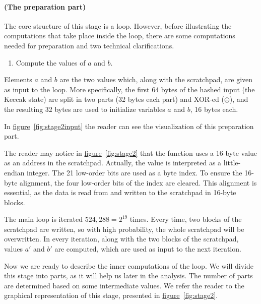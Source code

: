\paragraph{(The preparation part)} The core structure of this stage is a loop. However, before illustrating the computations that take place inside the loop, there are some computations needed for preparation and two technical clarifications.

\begin{enumerate}
  \item \label{memh: step 1} Compute the values of $a$ and $b$.
\end{enumerate}
Elements $a$ and $b$ are the two values which, along with the scratchpad, are given as input to the loop. More specifically, the first 64 bytes of the hashed input (the Keccak state) are split in two parts (32 bytes each part) and XOR-ed ($\oplus$), and the resulting 32 bytes are used to initialize variables $a$ and $b$, 16 bytes each.

In \hyperref[fig:stage2input]{figure}~\ref{fig:stage2input} the reader can see the visualization of this preparation part.
\clearpage

\begin{tcolorbox}[colback=yellow!5!white,colframe=yellow!65!black,title=\emph{Clarification 1:}]
  The reader may notice in \hyperref[fig:stage2]{figure}~\ref{fig:stage2} that the function uses a 16-byte value as an address in the scratchpad. Actually, the value is interpreted as a little-endian integer. The 21 low-order bits are used as a byte index. To ensure the 16-byte alignment, the four low-order bits of the index are cleared. This alignment is essential, as the data is read from and written to the scratchpad in 16-byte blocks.
\end{tcolorbox}
\vspace{0.2cm}

\begin{tcolorbox}[colback=yellow!5!white,colframe=yellow!65!black,title=\emph{Clarification 2:}]
  The main loop is iterated $524,288 = 2^{19}$ times. Every time, two blocks of the scratchpad are written, so with high probability, the whole scratchpad will be overwritten. In every iteration, along with the two blocks of the scratchpad, values $a'$ and $b'$ are computed, which are used as input to the next iteration.
\end{tcolorbox}
\vspace{0.2cm}

Now we are ready to describe the inner computations of the loop. We will divide this stage into parts, as it will help us later in the analysis. The number of parts are determined based on some intermediate values. We refer the reader to the graphical representation of this stage, presented in \hyperref[fig:stage2]{figure}~\ref{fig:stage2}.

